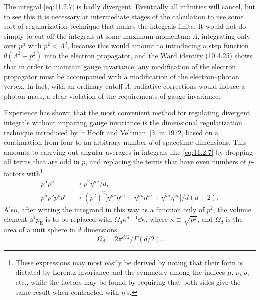 The integral \eqref{eq:11.2.7} is badly divergent. Eventually all infinities will
cancel, but to see this it is necessary at intermediate stages of the
calculation to use some sort of regularization technique that makes the
integrals finite. It would not do simply to cut off the integrals at some
maximum momentum $\Lambda$, integrating only over $p^\mu$ with
$p^2<\Lambda^2$, because this would amount to introducing a step function
$\theta(\Lambda^2-p^2)$ into the electron propagator, and the Ward identity
(10.4.25) shows that in order to maintain gauge invariance, any modification
of the electron propagator must be accompanied with a modification of the
electron--photon vertex. In fact, with an ordinary cutoff $\Lambda$, radiative
corrections would induce a photon mass, a clear violation of the requirements
of gauge invariance.

Experience has shown that the most convenient method for regulating
divergent integrals without impairing gauge invariance is the dimensional
regularization technique introduced by 't Hooft and Veltman~\hyperref[ref:11.3]{[3]} in 1972,
based on a continuation from four to an arbitrary number $d$ of spacetime
dimensions. This amounts to carrying out angular averages in integrals
like \eqref{eq:11.2.7} by dropping all terms that are odd in $p$, and replacing the
terms that have even numbers of $p$-factors with\footnote{These expressions
may most easily be derived by noting that their form is dictated by Lorentz
invariance and the symmetry among the indices $\mu$, $\nu$, $\rho$, etc.,
while the factors may be found by requiring that both sides give the same
result when contracted with $\eta$'s.}
\begin{align}
  p^\mu p^\nu&\longrightarrow p^2\eta^{\mu\nu}/d,
  \tag{11.2.8}\label{eq:11.2.8}\\
  p^\mu p^\nu p^\rho p^\sigma&\longrightarrow
  (p^2)^2\bigl[\eta^{\mu\nu}\eta^{\rho\sigma}
  +\eta^{\mu\rho}\eta^{\nu\sigma}
  +\eta^{\mu\sigma}\eta^{\nu\rho}\bigr]/d(d+2).
  \tag{11.2.9}\label{eq:11.2.9}
\end{align}
Also, after writing the integrand in this way as a function only of $p^2$,
the volume element $\dd^4p_{\mathrm E}$ is to be replaced with
$\Omega_d\kappa^{d-1}\dd\kappa$, where $\kappa\equiv\sqrt{p^2}$, and
$\Omega_d$ is the area of a unit sphere in $d$ dimensions
\begin{equation}
  \Omega_d=2\pi^{d/2}/\Gamma(d/2).
  \tag{11.2.10}\label{eq:11.2.10}
\end{equation}

